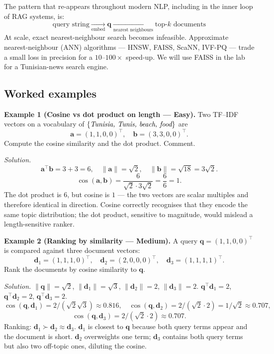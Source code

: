 \documentclass[12pt,a4paper]{report}
\theoremstyle{definition}
\theoremstyle{remark}
\begin{document}
The pattern that re-appears throughout modern NLP, including in the inner loop of RAG systems, is:
\[ \boxed{ \text{query string} \xrightarrow[\text{embed}]{} \mathbf{q} \xrightarrow[\text{nearest neighbours}]{} \text{top-}k \text{ documents} } \]
At scale, exact nearest-neighbour search becomes infeasible. Approximate nearest-neighbour (ANN) algorithms --- HNSW, FAISS, ScaNN, IVF-PQ --- trade a small loss in precision for a $10$--$100\times$ speed-up. We will use FAISS in the lab for a Tunisian-news search engine.

\subsection{Worked examples}

\textbf{Example 1 (Cosine vs dot product on length --- Easy).}
Two TF--IDF vectors on a vocabulary of $\{\emph{Tunisia, Tunis, beach, food}\}$ are
\[ \mathbf{a} = (1, 1, 0, 0)^\top, \quad \mathbf{b} = (3, 3, 0, 0)^\top. \]
Compute the cosine similarity and the dot product. Comment.

\textit{Solution.}
\[ \mathbf{a}^\top \mathbf{b} = 3 + 3 = 6, \quad \|\mathbf{a}\| = \sqrt{2}, \quad \|\mathbf{b}\| = \sqrt{18} = 3\sqrt{2}. \]
\[ \cos(\mathbf{a}, \mathbf{b}) = \frac{6}{\sqrt{2} \cdot 3\sqrt{2}} = \frac{6}{6} = 1. \]
The dot product is $6$, but cosine is $1$ --- the two vectors are scalar multiples and therefore identical in direction. Cosine correctly recognises that they encode the same topic distribution; the dot product, sensitive to magnitude, would mislead a length-sensitive ranker.

\medskip

\textbf{Example 2 (Ranking by similarity --- Medium).}
A query $\mathbf{q} = (1, 1, 0, 0)^\top$ is compared against three document vectors:
\[ \mathbf{d}_1 = (1, 1, 1, 0)^\top, \quad \mathbf{d}_2 = (2, 0, 0, 0)^\top, \quad \mathbf{d}_3 = (1, 1, 1, 1)^\top. \]
Rank the documents by cosine similarity to $\mathbf{q}$.

\textit{Solution.}
$\|\mathbf{q}\| = \sqrt{2}$, $\|\mathbf{d}_1\| = \sqrt{3}$, $\|\mathbf{d}_2\| = 2$, $\|\mathbf{d}_3\| = 2$.
$\mathbf{q}^\top \mathbf{d}_1 = 2$, $\mathbf{q}^\top \mathbf{d}_2 = 2$, $\mathbf{q}^\top \mathbf{d}_3 = 2$.
\[ \cos(\mathbf{q}, \mathbf{d}_1) = 2/(\sqrt{2}\sqrt{3}) \approx 0.816, \quad \cos(\mathbf{q}, \mathbf{d}_2) = 2/(\sqrt{2}\cdot 2) = 1/\sqrt{2} \approx 0.707, \]
\[ \cos(\mathbf{q}, \mathbf{d}_3) = 2/(\sqrt{2} \cdot 2) \approx 0.707. \]
Ranking: $\mathbf{d}_1 \succ \mathbf{d}_2 \approx \mathbf{d}_3$.
$\mathbf{d}_1$ is closest to $\mathbf{q}$ because both query terms appear and the document is short. $\mathbf{d}_2$ overweights one term; $\mathbf{d}_3$ contains both query terms but also two off-topic ones, diluting the cosine.
\end{document}

